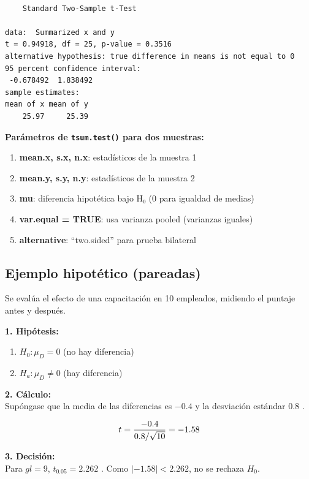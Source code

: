 \documentclass[
  spanish,
  letterpaper,
]{book}
\begin{document}
\begin{verbatim}

    Standard Two-Sample t-Test

data:  Summarized x and y
t = 0.94918, df = 25, p-value = 0.3516
alternative hypothesis: true difference in means is not equal to 0
95 percent confidence interval:
 -0.678492  1.838492
sample estimates:
mean of x mean of y 
    25.97     25.39 
\end{verbatim}

\textbf{Parámetros de \texttt{tsum.test()} para dos muestras:}

\begin{enumerate}
\def\labelenumi{\arabic{enumi}.}
\item
  \textbf{mean.x, s.x, n.x}: estadísticos de la muestra 1
\item
  \textbf{mean.y, s.y, n.y}: estadísticos de la muestra 2
\item
  \textbf{mu}: diferencia hipotética bajo H₀ (0 para igualdad de medias)
\item
  \textbf{var.equal = TRUE}: usa varianza pooled (varianzas iguales)
\item
  \textbf{alternative}: ``two.sided'' para prueba bilateral
\end{enumerate}

\subsection{Ejemplo hipotético
(pareadas)}\label{ejemplo-hipotuxe9tico-pareadas}

Se evalúa el efecto de una capacitación en 10 empleados, midiendo el
puntaje antes y después.

\textbf{1. Hipótesis:}

\begin{enumerate}
\def\labelenumi{\arabic{enumi}.}
\item
  \(H_0: \mu_D = 0\) (no hay diferencia)
\item
  \(H_a: \mu_D \neq 0\) (hay diferencia)
\end{enumerate}

\textbf{2. Cálculo:}\\
Supóngase que la media de las diferencias es \(-0.4\) y la desviación
estándar \(0.8\) .

\[\huge t = \frac{-0.4}{0.8/\sqrt{10}} = -1.58 \]

\textbf{3. Decisión:}\\
Para \(gl = 9\), \(t_{0.05} = 2.262\) . Como \(|-1.58| < 2.262\), no se
rechaza \(H_0\).
\end{document}
